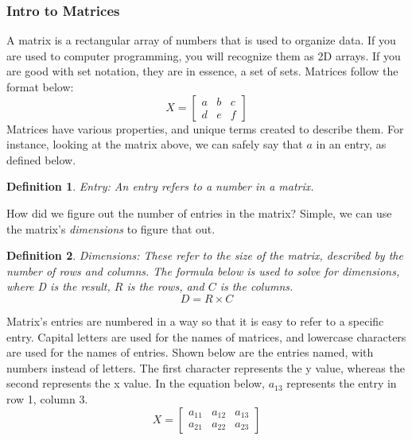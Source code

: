 \documentclass[final,1p,12pt]{elsarticle}
\newtheorem{definition}{Definition}
\begin{document}
        \subsubsection{Intro to Matrices}
        A matrix is a rectangular array of numbers that is used to organize data. If you are used to computer programming, you will recognize them as 2D arrays. If you are good with set notation, they are in essence, a set of sets. Matrices follow the format below:
        \begin{equation}
            X =
            \begin{bmatrix}
                a & b & c \\
                d & e & f
            \end{bmatrix}
        \end{equation}
        Matrices have various properties, and unique terms created to describe them. For instance, looking at the matrix above, we can safely say that $a$ in an entry, as defined below.
        \begin{definition}Entry:
            An entry refers to a number in a matrix.
        \end{definition}
        How did we figure out the number of entries in the matrix? Simple, we can use the matrix's \emph{dimensions} to figure that out.
        \begin{definition}Dimensions:
            These refer to the size of the matrix, described by the number of rows and columns. The formula below is used to solve for dimensions, where D is the result, $R$ is the rows, and $C$ is the columns.
            \begin{equation}
                D = R \times C
            \end{equation}
        \end{definition}
        Matrix's entries are numbered in a way so that it is easy to refer to a specific entry. Capital letters are used for the names of matrices, and lowercase characters are used for the names of entries. Shown below are the entries named, with numbers instead of letters. The first character represents the y value, whereas the second represents the x value. In the equation below, $a_{13}$ represents the entry in row 1, column 3.
        \begin{equation}
            X =
            \begin{bmatrix}
                a_{11} & a_{12} & a_{13} \\
                a_{21} & a_{22} & a_{23}
            \end{bmatrix}
        \end{equation}
        
\end{document}
